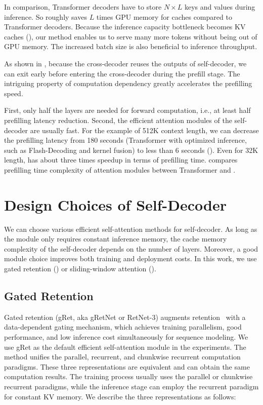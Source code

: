 In comparison, Transformer decoders have to store $N \times L$ keys and values during inference.
So \our{} roughly saves $L$ times GPU memory for caches compared to Transformer decoders.
Because the inference capacity bottleneck becomes KV caches (), our method enables us to serve many more tokens without being out of GPU memory.
The increased batch size is also beneficial to inference throughput.

As shown in , because the cross-decoder reuses the outputs of self-decoder, we can exit early before entering the cross-decoder during the prefill stage.
The intriguing property of computation dependency greatly accelerates the prefilling speed.

First, only half the layers are needed for forward computation, i.e., at least half prefilling latency reduction.
Second, the efficient attention modules of the self-decoder are usually fast.
For the example of 512K context length, we can decrease the prefilling latency from 180 seconds (Transformer with optimized inference, such as Flash-Decoding and kernel fusion) to less than 6 seconds ().
Even for 32K length, \our{} has about three times speedup in terms of prefilling time.
 compares prefilling time complexity of attention modules between Transformer and \our{}.

\section{Design Choices of Self-Decoder}
\label{sec:design:self:decoder}

We can choose various efficient self-attention methods for self-decoder.
As long as the module only requires constant inference memory, the cache memory complexity of the self-decoder depends on the number of layers.
Moreover, a good module choice improves both training and deployment costs.
In this work, we use gated retention () or sliding-window attention ().

\subsection{Gated Retention}
\label{sec:gret}

Gated retention (gRet, aka gRetNet or RetNet-3) augments retention~\cite{retnet} with a data-dependent gating mechanism, which achieves training parallelism, good performance, and low inference cost simultaneously for sequence modeling.
We use gRet as the default efficient self-attention module in the experiments.
The method unifies the parallel, recurrent, and chunkwise recurrent computation paradigms. These three representations are equivalent and can obtain the same computation results.
The training process usually uses the parallel or chunkwise recurrent paradigms, while the inference stage can employ the recurrent paradigm for constant KV memory.
We describe the three representations as follows:

